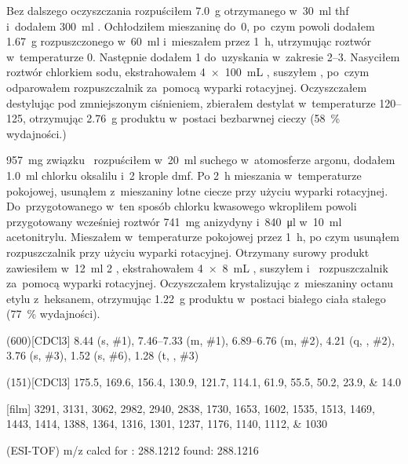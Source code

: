 Bez dalszego oczyszczania rozpuściłem \SI{7.0}{\gram} otrzymanego 
  w~\SI{30}{\ml} \gls{thf} i~dodałem \SI{300}{\ml} .
Ochłodziłem mieszaninę do~\SI{0}{\degC}, po~czym powoli dodałem \SI{1.67}{\gram} 
  rozpuszczonego w~\SI{60}{\ml}  i~mieszałem przez \SI{1}{\hour},
  utrzymując roztwór w~temperaturze \SI{0}{\degC}.
Następnie dodałem \SI{1}{\Molar}  do~uzyskania \pH w~zakresie \numrange{2}{3}.
Nasyciłem roztwór chlorkiem sodu, ekstrahowałem \SI[product-units = single]{4 x 100}{\mL} ,
  suszyłem , po~czym odparowałem rozpuszczalnik za~pomocą wyparki rotacyjnej.
Oczyszczałem destylując pod zmniejszonym ciśnieniem, zbierałem destylat w~temperaturze
  \SIrange{120}{125}{\degC}, otrzymując \SI{2.76}{\gram} produktu w~postaci bezbarwnej cieczy
  (\SI{58}{\percent} wydajności.)

\SI{957}{\mg} związku~ rozpuściłem w~\SI{20}{\ml}
  suchego  w~atomosferze argonu, dodałem \SI{1.0}{\ml} chlorku oksalilu
  i~\num{2} krople \gls{dmf}.
Po \SI{2}{\hour} mieszania w~temperaturze pokojowej, usunąłem z~mieszaniny lotne ciecze
  przy użyciu wyparki rotacyjnej.
Do~przygotowanego w~ten sposób chlorku kwasowego wkropliłem powoli przygotowany wcześniej roztwór
  \SI{741}{\mg} anizydyny i~\SI{840}{\ul}  w~\SI{10}{\ml} acetonitrylu.
Mieszałem w~temperaturze pokojowej przez \SI{1}{\hour}, po czym usunąłem rozpuszczalnik
  przy użyciu wyparki rotacyjnej.
Otrzymany surowy produkt zawiesiłem w~\SI{12}{\ml} \SI{2}{\Molar} ,
  ekstrahowałem \SI[product-units = single]{4 x 8}{\mL} , suszyłem 
  i~ rozpuszczalnik za~pomocą wyparki rotacyjnej.
Oczyszczałem krystalizując z~mieszaniny octanu etylu z~heksanem, otrzymując \SI{1.22}{\gram}
  produktu w~postaci białego ciała stałego (\SI{77}{\percent} wydajności).
\begin{fullexp}
  \NMR(600)[CDCl3] \num{8.44} (s, \#{1}), \numrange{7.46}{7.33} (m, \#{1}), \numrange{6.89}{6.76} (m, \#{2}), \num{4.21} (q, , \#{2}), \num{3.76} (s, \#{3}), \num{1.52} (s, \#{6}), \num{1.28} (t, , \#{3})\par\noindent
  (151)[CDCl3] \numlist{175.5; 169.6; 156.4; 130.9; 121.7; 114.1; 61.9; 55.5; 50.2; 23.9; 14.0}\par\noindent
  [film] \numlist{3291; 3131; 3062; 2982; 2940; 2838; 1730; 1653; 1602; 1535; 1513; 1469; 1443; 1414; 1388; 1364; 1316; 1301; 1237; 1176; 1140; 1112; 1030}\par\noindent
   (ESI-TOF) m/z calcd for : \num{288.1212} found: \num{288.1216}
\end{fullexp}
  
